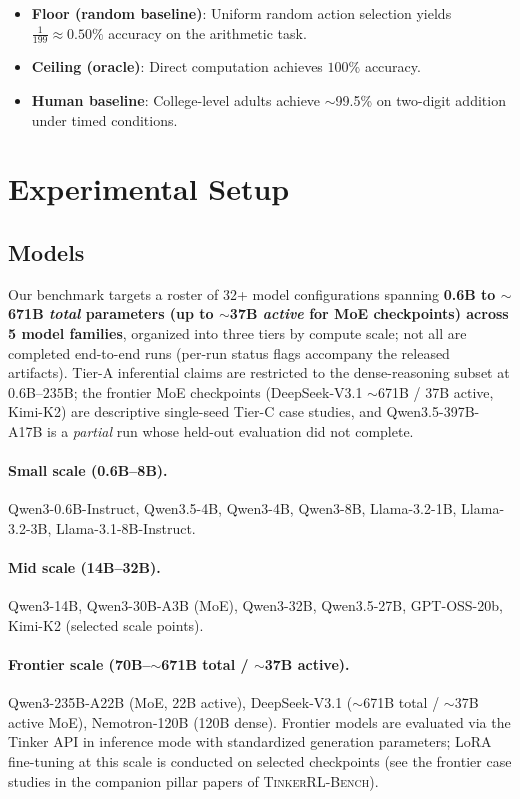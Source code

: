 \documentclass{article}
\newcommand{\ours}{\textsc{TinkerRL-Bench}}
\begin{document}
\begin{itemize}
    \item \textbf{Floor (random baseline)}: Uniform random action selection yields
    $\frac{1}{199} \approx 0.50\%$ accuracy on the arithmetic task.
    \item \textbf{Ceiling (oracle)}: Direct computation achieves $100\%$ accuracy.
    \item \textbf{Human baseline}: College-level adults achieve $\sim$99.5\% on
    two-digit addition under timed conditions.
\end{itemize}

\section{Experimental Setup}
\label{sec:setup}


\subsection{Models}

Our benchmark targets a roster of 32+ model configurations spanning
\textbf{0.6B to $\sim$671B \emph{total} parameters (up to $\sim$37B \emph{active}
for MoE checkpoints) across 5 model families}, organized into three
tiers by compute scale; not all are completed end-to-end runs (per-run
status flags accompany the released artifacts). Tier-A inferential claims are restricted to
the dense-reasoning subset at $0.6$B--$235$B; the frontier MoE
checkpoints (DeepSeek-V3.1 $\sim$671B / 37B active, Kimi-K2) are
descriptive single-seed Tier-C case studies, and Qwen3.5-397B-A17B is a
\emph{partial} run whose held-out evaluation did not complete.

\paragraph{Small scale (0.6B--8B).}
Qwen3-0.6B-Instruct, Qwen3.5-4B, Qwen3-4B, Qwen3-8B,
Llama-3.2-1B, Llama-3.2-3B, Llama-3.1-8B-Instruct.

\paragraph{Mid scale (14B--32B).}
Qwen3-14B, Qwen3-30B-A3B (MoE), Qwen3-32B, Qwen3.5-27B,
GPT-OSS-20b, Kimi-K2 (selected scale points).

\paragraph{Frontier scale (70B--$\sim$671B total / $\sim$37B active).}
Qwen3-235B-A22B (MoE, 22B active), DeepSeek-V3.1 ($\sim$671B total /
$\sim$37B active MoE), Nemotron-120B (120B dense).
Frontier models are evaluated via the Tinker API in inference mode
with standardized generation parameters; LoRA fine-tuning at this
scale is conducted on selected checkpoints (see the frontier case studies
in the companion pillar papers of \ours{}).
\end{document}
